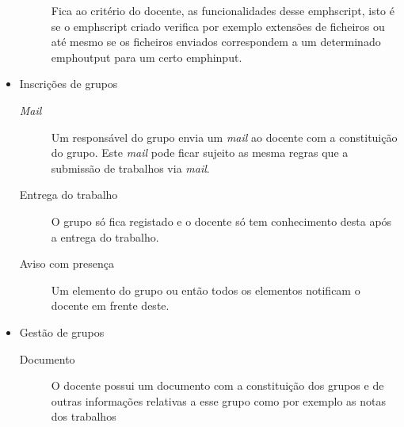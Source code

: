 \begin{itemize}
		\begin{description}
			Fica ao critério do docente, as funcionalidades desse emph{script}, isto é se o emph{script} criado verifica por exemplo extensões de ficheiros ou até mesmo se os ficheiros enviados correspondem a um determinado emph{output} para um certo emph{input}.
		\end{description}
	\item Inscrições de grupos
	\begin{description}
		\item[\emph{Mail}] Um responsável do grupo envia um \emph{mail} ao docente com a constituição do grupo. Este \emph{mail} pode ficar sujeito as mesma regras que a submissão de trabalhos via \emph{mail}.
		\item[Entrega do trabalho] O grupo só fica registado e o docente só tem conhecimento desta após a entrega do trabalho.
		\item[Aviso com presença] Um elemento do grupo ou então todos os elementos notificam o docente em frente deste.
	\end{description}
	\item Gestão de grupos
	\begin{description}
		\item[Documento] O docente possui um documento com a constituição dos grupos e de outras informações relativas a esse grupo como por exemplo as notas dos trabalhos
	\end{description}

\end{itemize}





